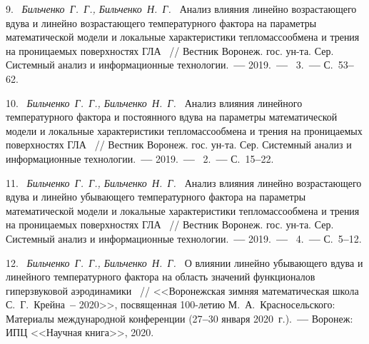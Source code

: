 9.~%
\textit%
{Бильченко~Г.~Г.,  
 Бильченко~Н.~Г.~}  
{%
  {Анализ  влияния  
линейно  возрастающего 
вдува  
и  
линейно  возрастающего 
температурного  фактора  
на  параметры  математической  модели  и
локальные  характеристики  тепломассообмена  
и  трения 
на  проницаемых  поверхностях  ГЛА}%
~/$\!$/  
  Вестник  Воронеж.  гос.  ун-та. 
  Сер.  Системный  анализ  
  и  информационные  технологии.~{\textbf{---}} 
  2019.~{\textbf{---}} 
  \No~3.~{\textbf{---}} 
  С.~53{\textbf{--}}62.%
  }



10.~%
\textit%
{Бильченко~Г.~Г.,  
 Бильченко~Н.~Г.~}  
{%
  {Ана\-лиз  влияния  
линейного  температурного  фактора  
и  постоянного  вдува
на  параметры  математической  модели  и
локальные  характеристики  тепломассообмена  
и  трения 
на  проницаемых  поверхностях  ГЛА}%
~/$\!$/ 
  Вестник  Воронеж.  гос.  ун-та. 
  Сер.  Системный  анализ  
  и  информационные  технологии.~{\textbf{---}} 
  2019.~{\textbf{---}}  
  \No~2.~{\textbf{---}}  
  С.~15{\textbf{--}}22.%
  }



11.~%
\textit%
{Бильченко~Г.~Г.,  
 Бильченко~Н.~Г.~}  
{%
  {Анализ  влияния  
линейно  возрастающего 
вдува  
и  
линейно  убывающего 
температурного  фактора  
на  параметры  математической  модели  и
локальные  характеристики  тепломассообмена  
и  трения 
на  проницаемых  поверхностях  ГЛА}%
~/$\!$/  
  Вестник  Воронеж.  гос.  ун-та. 
  Сер.  Системный  анализ  
  и  информационные  технологии.~{\textbf{---}} 
  2019.~{\textbf{---}} 
  \No~4.~{\textbf{---}} 
  С.~5{\textbf{--}}12.%
  }



12.~%
\textit%
{Бильченко~Г.~Г.,  
 Бильченко~Н.~Г.~}  
{%
  {О  влиянии  линейно  убывающего  вдува 
и  линейного  температурного  фактора 
на  область  значений  функционалов 
гиперзвуковой  аэродинамики}%
~/$\!$/  
  <<Воронежская  зимняя  математическая  школа 
  С.~Г.~Крейна~{\textbf{--}}  2020>>,  
  посвященная  100-летию  
  М.~А.~Красносельского: 
  Материалы  международной  конференции 
  (27{\textbf{--}}30  
  января  2020~г.).~{\textbf{---}} 
  Воронеж:  ИПЦ  <<Научная  книга>>, 
  2020.%
  } 



